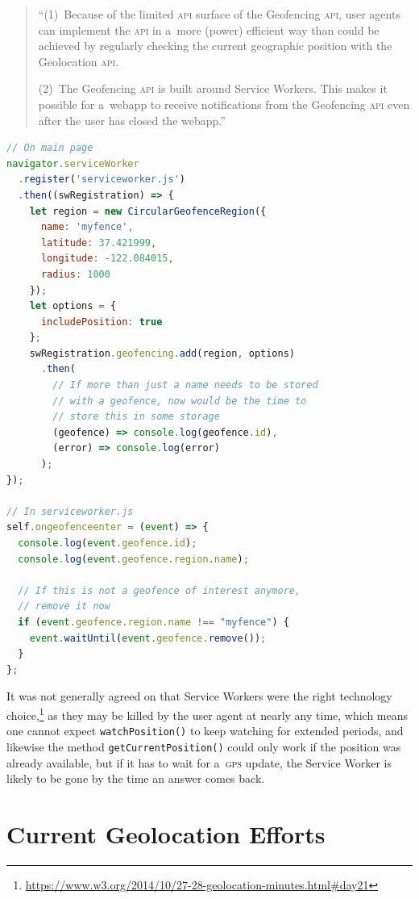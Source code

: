 \documentclass[sigconf,hyphens]{acmart}
\begin{document}
\begin{quote}
``(1)~Because of the limited \textsc{api} surface of the Geofencing \textsc{api},
user agents can implement the \textsc{api} in a~more (power) efficient way
than could be achieved by regularly checking the current geographic position with the Geolocation
\textsc{api}.

(2)~The Geofencing \textsc{api} is built around Service Workers.
This makes it possible for a~webapp to receive notifications from the Geofencing \textsc{api}
even after the user has closed the webapp.''	
\end{quote}

\begin{lstlisting}[caption={Geofencing \textsc{api} (conceived example)},
  label=code:geofence, language=JavaScript, float=b] 
// On main page
navigator.serviceWorker
  .register('serviceworker.js')
  .then((swRegistration) => {
    let region = new CircularGeofenceRegion({
      name: 'myfence',
      latitude: 37.421999,
      longitude: -122.084015,
      radius: 1000
    });
    let options = {
      includePosition: true
    };
    swRegistration.geofencing.add(region, options)
      .then(
        // If more than just a name needs to be stored
        // with a geofence, now would be the time to
        // store this in some storage
        (geofence) => console.log(geofence.id),
        (error) => console.log(error)
      );
});

// In serviceworker.js
self.ongeofenceenter = (event) => {
  console.log(event.geofence.id);
  console.log(event.geofence.region.name);

  // If this is not a geofence of interest anymore,
  // remove it now
  if (event.geofence.region.name !== "myfence") {
    event.waitUntil(event.geofence.remove());
  }
};
\end{lstlisting}

It was not generally agreed on that Service Workers were the right technology
choice,\footnote{\url{https://www.w3.org/2014/10/27-28-geolocation-minutes.html\#day21}}
as they may be killed by the user agent at nearly any time,
which means one cannot expect \texttt{watchPosition()} to keep watching for extended periods,
and likewise the method \texttt{getCurrentPosition()} could only work if the position was already
available, but if it has to wait for a~\textsc{gps} update, the Service Worker is likely to be gone
by the time an answer comes back.

\section{Current Geolocation Efforts}
\end{document}
